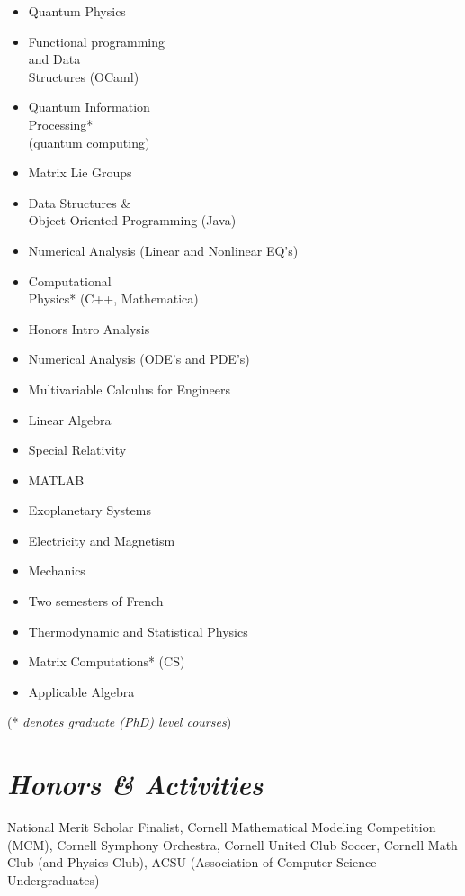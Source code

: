 \documentclass{res}
\begin{document}
{\begin{resume}
\begin{multicols}{3}
\begin{itemize}
\item{Quantum Physics}
\item{Functional programming\\
and Data\\
Structures (OCaml)}
\item{Quantum Information\\
Processing*\\
(quantum computing)}
\item{Matrix Lie Groups}
\item{Data Structures \&\\
Object Oriented Programming (Java)}
\item{Numerical Analysis (Linear and Nonlinear EQ's)}
\item{Computational\\
Physics* (C++, Mathematica)}
\item{Honors Intro Analysis}
\item{Numerical Analysis (ODE's and PDE's)}
\item{Multivariable Calculus for Engineers}
\item{Linear Algebra}
\item{Special Relativity}
\item{MATLAB}
\item{Exoplanetary Systems}
\item{Electricity and Magnetism}
\item{Mechanics}
\item{Two semesters of French}
\item{Thermodynamic and Statistical Physics}
\item{Matrix Computations* (CS)}
\item{Applicable Algebra}

\end{itemize}
\end{multicols}
\begin{center}
(* \textit{denotes graduate (PhD) level courses})
\end{center}

\section{\sl\bf  Honors \& Activities}
\begin{ncolumn}{1}
National Merit Scholar Finalist, Cornell Mathematical Modeling Competition (MCM), Cornell Symphony Orchestra, Cornell United Club Soccer, Cornell Math Club (and Physics Club), ACSU (Association of Computer Science Undergraduates)
\end{ncolumn}

\end{resume}
\vfill} %
\end{document}
